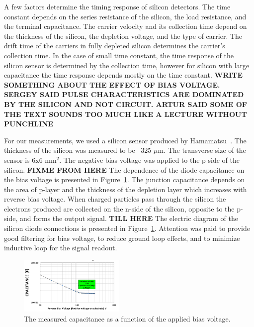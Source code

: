 \documentclass[12pt]{article}
\begin{document}
{A few factors determine the timing response of silicon detectors. The
time constant depends on the series resistance of the silicon, the load
resistance, and the terminal capacitance. The carrier velocity and its collection
time depend on the thickness of the silicon, the depletion voltage, and the type of
carrier. The drift time of the carriers in fully depleted silicon determines the 
carrier's collection time. In the case of small time constant, the time
response of the silicon sensor is determined by the collection time, however
for silicon with large capacitance the time response depends mostly on the
time constant. \textbf {WRITE SOMETHING ABOUT THE EFFECT OF BIAS VOLTAGE. SERGEY SAID PULSE CHARACTERISTICS ARE DOMINATED BY THE SILICON AND NOT CIRCUIT. ARTUR SAID SOME OF THE TEXT SOUNDS TOO MUCH LIKE A LECTURE WITHOUT PUNCHLINE}

For our measurements, we used a silicon sensor produced by
Hamamatsu~\cite{hamamatsu}. The thickness of the silicon was measured to be ~325
$\mu$m. The transverse size of the sensor is 6x6 mm$^2$. The negative bias
voltage was applied to the p-side of the silicon. \textbf{FIXME FROM HERE} The
dependence of the diode capacitance on the bias voltage is presented in
Figure~\ref{fig:SiliconDiode}. The junction capacitance depends on the area of
p-layer and the thickness of the depletion layer which increases with reverse
bias voltage. When charged particles pass through the silicon the electrons
produced are collected on the n-side of the silicon, opposite to the p-side, and
forms the output signal. \textbf{TILL HERE} The electric diagram of the silicon
diode connections is presented in Figure~\ref{fig:SiliconDiode}. Attention was
paid to provide good filtering for bias voltage, to reduce ground loop effects, and
to minimize inductive loop for the signal readout.


\begin{figure}[htbp] 
\centering
\includegraphics[width=0.45\textwidth]{plots/SiliconDiodeCV.png} 
\caption{The measured capacitance as a function of the applied bias voltage.} 
\label{fig:SiliconDiode} 
\end{figure} 


}
\end{document}
